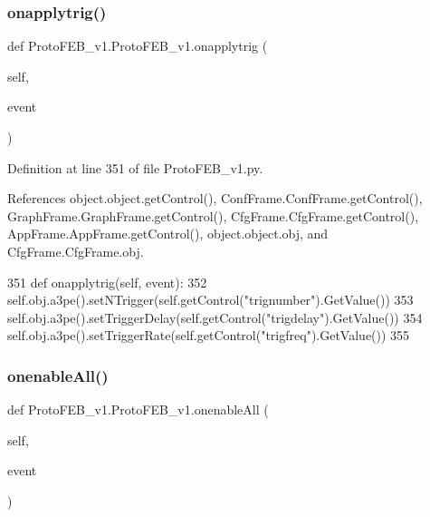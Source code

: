 \subsubsection{\texorpdfstring{onapplytrig()}{onapplytrig()}}
{\footnotesize\ttfamily def Proto\+F\+E\+B\+\_\+v1.\+Proto\+F\+E\+B\+\_\+v1.\+onapplytrig (\begin{DoxyParamCaption}\item[{}]{self,  }\item[{}]{event }\end{DoxyParamCaption})}



Definition at line 351 of file Proto\+F\+E\+B\+\_\+v1.\+py.



References object.\+object.\+get\+Control(), Conf\+Frame.\+Conf\+Frame.\+get\+Control(), Graph\+Frame.\+Graph\+Frame.\+get\+Control(), Cfg\+Frame.\+Cfg\+Frame.\+get\+Control(), App\+Frame.\+App\+Frame.\+get\+Control(), object.\+object.\+obj, and Cfg\+Frame.\+Cfg\+Frame.\+obj.


\begin{DoxyCode}
351     \textcolor{keyword}{def }onapplytrig(self, event):
352         self.obj.a3pe().setNTrigger(self.getControl(\textcolor{stringliteral}{"trignumber"}).GetValue())
353         self.obj.a3pe().setTriggerDelay(self.getControl(\textcolor{stringliteral}{"trigdelay"}).GetValue())
354         self.obj.a3pe().setTriggerRate(self.getControl(\textcolor{stringliteral}{"trigfreq"}).GetValue())
355 
\end{DoxyCode}
\mbox{\label{classProtoFEB__v1_1_1ProtoFEB__v1_ad7f0700c99d68f8d6fb83d413f22f6ca}} 
\subsubsection{\texorpdfstring{onenable\+All()}{onenableAll()}}
{\footnotesize\ttfamily def Proto\+F\+E\+B\+\_\+v1.\+Proto\+F\+E\+B\+\_\+v1.\+onenable\+All (\begin{DoxyParamCaption}\item[{}]{self,  }\item[{}]{event }\end{DoxyParamCaption})}



